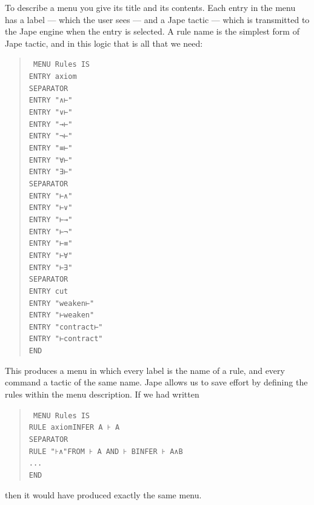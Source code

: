 To describe a menu you give its title and its contents. Each entry in the menu has a label --- which the user sees --- and a Jape tactic --- which is transmitted to the Jape engine when the entry is selected. A rule name is the simplest form of Jape tactic, and in this logic that is all that we need:
\begin{quote}\tt\small
MENU Rules IS\\
\tab   ENTRY axiom\\
\tab   SEPARATOR\\
\tab   ENTRY "∧⊢"\\
\tab   ENTRY "∨⊢"\\
\tab   ENTRY "→⊢"\\
\tab   ENTRY "¬⊢"\\
\tab   ENTRY "≡⊢"\\
\tab   ENTRY "∀⊢"\\
\tab   ENTRY "∃⊢"\\
\tab   SEPARATOR\\
\tab   ENTRY "⊢∧"\\
\tab   ENTRY "⊢∨"\\
\tab   ENTRY "⊢→"\\
\tab   ENTRY "⊢¬"\\
\tab   ENTRY "⊢≡"\\
\tab   ENTRY "⊢∀"\\
\tab   ENTRY "⊢∃"\\
\tab   SEPARATOR\\
\tab   ENTRY cut   \\
\tab   ENTRY "weaken⊢"\\
\tab   ENTRY "⊢weaken"\\
\tab   ENTRY "contract⊢"\\
\tab   ENTRY "⊢contract"\\
END
\end{quote}

This produces a menu in which every label is the name of a rule, and every command a tactic of the same name. Jape allows us to save effort by defining the rules within the menu description. If we had written
\begin{quote}\tt\small
MENU Rules IS\\
\tab RULE axiom\tab INFER A ⊦ A\\
\tab SEPARATOR\\
\tab RULE "⊦∧"\tab FROM ⊦ A AND ⊦ B\tab INFER ⊦ A∧B\\
\tab ...\\
END
\end{quote}
then it would have produced exactly the same menu.

